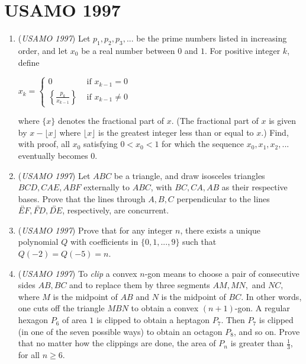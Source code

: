 \section{USAMO 1997}
        \begin{enumerate}
        	\item (\textit{USAMO 1997}) Let $p_1,p_2,p_3,...$ be the prime numbers listed in increasing order, and let $x_0$ be a real number between $0$ and $1$. For positive integer $k$, define


 $x_{k}=\begin{cases}0&\text{ if }x_{k-1}=0\\ \left\{\frac{p_{k}}{x_{k-1}}\right\}&\text{ if }x_{k-1}\ne0\end{cases}$


 where $\{x\}$ denotes the fractional part of $x$. (The fractional part of $x$ is given by $x-\lfloor{x}\rfloor$ where $\lfloor{x}\rfloor$ is the greatest integer less than or equal to $x$.) Find, with proof, all $x_0$ satisfying $0<x_0<1$ for which the sequence $x_0,x_1,x_2,...$ eventually becomes $0$.


 

	\item (\textit{USAMO 1997}) Let $ABC$ be a triangle, and draw isosceles triangles $BCD, CAE, ABF$ externally to $ABC$, with $BC, CA, AB$ as their respective bases. Prove that the lines through $A,B,C$ perpendicular to the lines $\overleftrightarrow{EF},\overleftrightarrow{FD},\overleftrightarrow{DE}$, respectively, are concurrent.


 

	\item (\textit{USAMO 1997}) Prove that for any integer $n$, there exists a unique polynomial $Q$ with coefficients in $\{0,1,...,9\}$ such that $Q(-2)=Q(-5)=n$.


 

	\item (\textit{USAMO 1997}) To \textit{clip} a convex $n$-gon means to choose a pair of consecutive sides $AB, BC$ and to replace them by three segments $AM, MN,$ and $NC,$ where $M$ is the midpoint of $AB$ and $N$ is the midpoint of $BC$. In other words, one cuts off the triangle $MBN$ to obtain a convex $(n+1)$-gon. A regular hexagon $P_6$ of area $1$ is clipped to obtain a heptagon $P_7$. Then $P_7$ is clipped (in one of the seven possible ways) to obtain an octagon $P_8$, and so on. Prove that no matter how the clippings are done, the area of $P_n$ is greater than $\frac{1}{3}$, for all $n\ge6$.



\end{enumerate}
